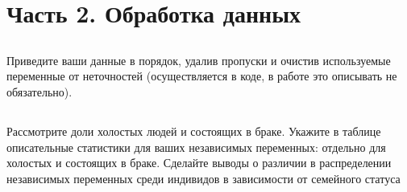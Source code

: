 \documentclass[a4paper,12pt]{article}
\begin{document}
\section{Часть 2. Обработка данных}
\subsection{}
\Sun  Приведите ваши данные в порядок, удалив пропуски и очистив используемые
переменные от неточностей (осуществляется в коде, в работе это описывать не
обязательно).

\subsection{}
\Sun Рассмотрите доли холостых людей и состоящих в браке. Укажите в таблице
описательные статистики для ваших независимых переменных: отдельно для холостых и
состоящих в браке. Сделайте выводы о различии в распределении независимых
переменных среди индивидов в зависимости от семейного статуса
\end{document}

